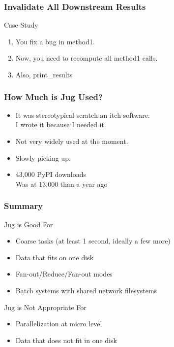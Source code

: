 \documentclass{beamer}
\begin{document}
\begin{frame}[fragile]
\frametitle{Invalidate All Downstream Results}
\begin{block}{Case Study}
\begin{enumerate}
\item You fix a bug in \alert{method1}.
\item Now, you need to recompute all \alert{method1} calls.
\item Also, \alert{print\_results}
\end{enumerate}
\end{block}
\end{frame}

\begin{frame}[fragile]
\frametitle{How Much is Jug Used?}

\begin{itemize}
\item It was stereotypical \alert{scratch an itch} software:\\
    I wrote it because I needed it.
\item Not very widely used at the moment.
\item Slowly picking up:
\item 43,000 PyPI downloads\\
    \alert{Was at 13,000 than a year ago}
\end{itemize}

\end{frame}

\begin{frame}[fragile]
\frametitle{Summary}
\begin{block}{Jug is Good For}
\begin{itemize}
\item Coarse tasks (at least 1 second, ideally a few more)
\item Data that fits on one disk
\item Fan-out/Reduce/Fan-out modes
\item Batch systems with shared network filesystems
\end{itemize}
\end{block}

\begin{block}{Jug is Not Appropriate For}
\begin{itemize}
\item Parallelization at micro level
\item Data that does not fit in one disk
\end{itemize}
\end{block}
\end{frame}
\end{document}
